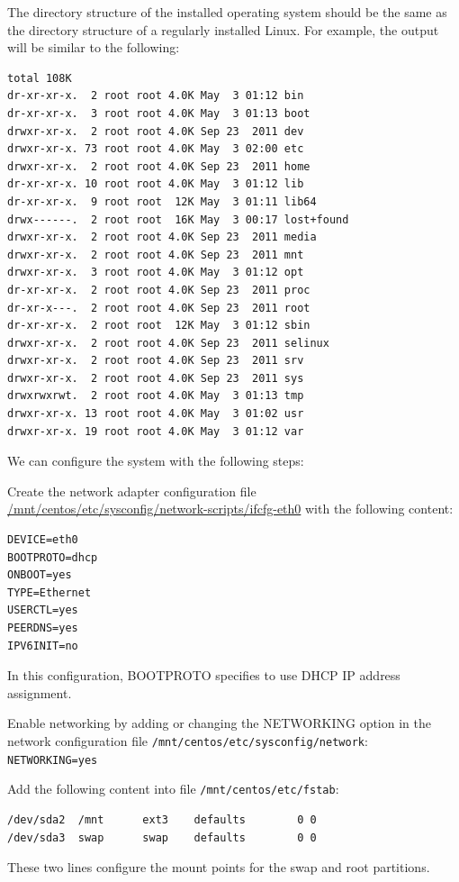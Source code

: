 The directory structure of the installed operating system should be the same as the directory structure of a regularly installed Linux. For example, the output will be similar to the following:
\lstset{style=bashstyle}
\begin{lstlisting}
total 108K
dr-xr-xr-x.  2 root root 4.0K May  3 01:12 bin
dr-xr-xr-x.  3 root root 4.0K May  3 01:13 boot
drwxr-xr-x.  2 root root 4.0K Sep 23  2011 dev
drwxr-xr-x. 73 root root 4.0K May  3 02:00 etc
drwxr-xr-x.  2 root root 4.0K Sep 23  2011 home
dr-xr-xr-x. 10 root root 4.0K May  3 01:12 lib
dr-xr-xr-x.  9 root root  12K May  3 01:11 lib64
drwx------.  2 root root  16K May  3 00:17 lost+found
drwxr-xr-x.  2 root root 4.0K Sep 23  2011 media
drwxr-xr-x.  2 root root 4.0K Sep 23  2011 mnt
drwxr-xr-x.  3 root root 4.0K May  3 01:12 opt
dr-xr-xr-x.  2 root root 4.0K Sep 23  2011 proc
dr-xr-x---.  2 root root 4.0K Sep 23  2011 root
dr-xr-xr-x.  2 root root  12K May  3 01:12 sbin
drwxr-xr-x.  2 root root 4.0K Sep 23  2011 selinux
drwxr-xr-x.  2 root root 4.0K Sep 23  2011 srv
drwxr-xr-x.  2 root root 4.0K Sep 23  2011 sys
drwxrwxrwt.  2 root root 4.0K May  3 01:13 tmp
drwxr-xr-x. 13 root root 4.0K May  3 01:02 usr
drwxr-xr-x. 19 root root 4.0K May  3 01:12 var
\end{lstlisting}

We can configure the system with the following steps:

Create the network adapter configuration file \url{/mnt/centos/etc/sysconfig/network-scripts/ifcfg-eth0} with the following content:
\lstset{style=bashstyle}
\begin{lstlisting}
DEVICE=eth0
BOOTPROTO=dhcp
ONBOOT=yes
TYPE=Ethernet
USERCTL=yes
PEERDNS=yes
IPV6INIT=no
\end{lstlisting}

In this configuration, BOOTPROTO specifies to use DHCP IP address assignment.


Enable networking by adding or changing the NETWORKING option in the network configuration file \verb|/mnt/centos/etc/sysconfig/network|:\\
\verb|NETWORKING=yes|

Add the following content into file \verb|/mnt/centos/etc/fstab|:
\lstset{style=bashstyle}
\begin{lstlisting}
/dev/sda2  /mnt      ext3    defaults        0 0
/dev/sda3  swap      swap    defaults        0 0
\end{lstlisting}

These two lines configure the mount points for the swap and root partitions.

